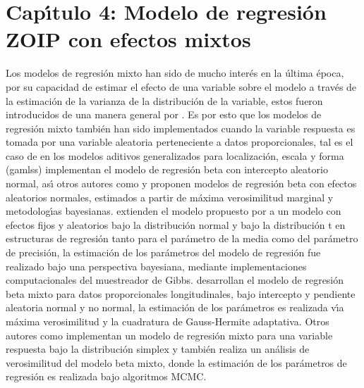 \chapter{Cap\'{\i}tulo 4: Modelo de regresi\'{o}n ZOIP con efectos mixtos}\label{cap4}

Los modelos de regresi\'{o}n mixto han sido de mucho inter\'{e}s en la \'{u}ltima \'{e}poca, por su capacidad de estimar el efecto de una variable sobre el modelo a trav\'{e}s de la estimaci\'{o}n de la varianza de la distribuci\'{o}n de la variable, estos fueron introducidos de una manera general por \cite{Laird1}. Es por esto que los modelos de regresi\'{o}n mixto tambi\'{e}n han sido implementados cuando la variable respuesta es tomada por una variable aleatoria perteneciente a datos proporcionales, tal es el caso de \cite{Stasinopoulos2} en los modelos aditivos generalizados para localizaci\'{o}n, escala y forma (gamlss) implementan el modelo de regresi\'{o}n beta con intercepto aleatorio normal, as\'{\i} otros autores como \cite{Verkuilen1} y \cite{Bonat1} proponen modelos de regresi\'{o}n beta con efectos aleatorios normales, estimados a partir de m\'{a}xima verosimilitud marginal y metodolog\'{\i}as bayesianas. \cite{Figueroa1} extienden el modelo propuesto por \cite{Ferrari2} a un modelo con efectos fijos y aleatorios bajo la distribuci\'{o}n normal y bajo la distribuci\'{o}n t en estructuras de regresi\'{o}n tanto para el par\'{a}metro de la media como del par\'{a}metro de precisi\'{o}n, la estimaci\'{o}n de los par\'{a}metros del modelo de regresi\'{o}n fue realizado bajo una perspectiva bayesiana, mediante implementaciones computacionales del muestreador de Gibbs. \cite{Usuga1} desarrollan el modelo de regresi\'{o}n beta mixto para datos proporcionales longitudinales, bajo intercepto y pendiente aleatoria normal y no normal, la estimaci\'{o}n de los par\'{a}metros es realizada v\'{\i}a m\'{a}xima verosimilitud y la cuadratura de Gauss-Hermite adaptativa. Otros autores como \cite{Song1} implementan un modelo de regresi\'{o}n mixto para una variable respuesta bajo la distribuci\'{o}n simplex y \cite{Bonat2} tambi\'{e}n realiza un an\'{a}lisis de verosimilitud del modelo beta mixto, donde la estimaci\'{o}n de los par\'{a}metros de regresi\'{o}n es realizada bajo algoritmos MCMC.\\

